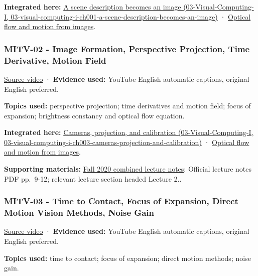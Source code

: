 \textbf{Integrated here:} \href{../03-Visual-Computing-I/main.pdf\#nameddest=03-visual-computing-i-ch001-a-scene-description-becomes-an-image}{A scene description becomes an image (03-Visual-Computing-I, 03-visual-computing-i-ch001-a-scene-description-becomes-an-image)} · \hyperref[04-visual-computing-ii-ch030-optical-flow-and-motion-from-images]{Optical flow and motion from images}.

\subsubsection{MITV-02 - Image Formation, Perspective Projection, Time Derivative, Motion Field}\label{04-visual-computing-ii-ch036-mitv-02---image-formation-perspective-projection-time-derivative-motion-field}

\href{https://www.youtube.com/watch?v=uM5AoUgCA00}{Source video} · \textbf{Evidence used:} YouTube English automatic captions, original English preferred.

\textbf{Topics used:} perspective projection; time derivatives and motion field; focus of expansion; brightness constancy and optical flow equation.

\textbf{Integrated here:} \href{../03-Visual-Computing-I/main.pdf\#nameddest=03-visual-computing-i-ch003-cameras-projection-and-calibration}{Cameras, projection, and calibration (03-Visual-Computing-I, 03-visual-computing-i-ch003-cameras-projection-and-calibration)} · \hyperref[04-visual-computing-ii-ch030-optical-flow-and-motion-from-images]{Optical flow and motion from images}.

\textbf{Supporting materials:} \href{https://ocw.mit.edu/courses/6-801-machine-vision-fall-2020/9ec44f69e72995c370b3797818ba01e6_MIT6_801F20_lectureNotes.pdf}{Fall 2020 combined lecture notes}: Official lecture notes PDF pp.~9-12; relevant lecture section headed Lecture 2..

\subsubsection{MITV-03 - Time to Contact, Focus of Expansion, Direct Motion Vision Methods, Noise Gain}\label{04-visual-computing-ii-ch036-mitv-03---time-to-contact-focus-of-expansion-direct-motion-vision-methods-noise-gain}

\href{https://www.youtube.com/watch?v=t9w_WuyVJ-A}{Source video} · \textbf{Evidence used:} YouTube English automatic captions, original English preferred.

\textbf{Topics used:} time to contact; focus of expansion; direct motion methods; noise gain.

